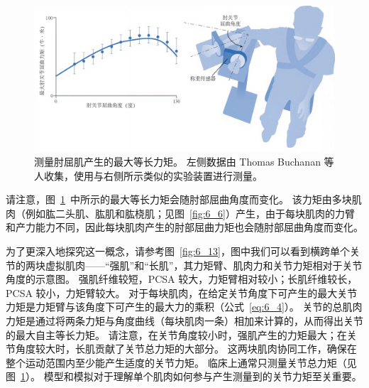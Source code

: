 \begin{figure}[!htb]
	\centering
	\includegraphics[width=1.0\linewidth]{chap6/6_12}
	\caption{测量肘屈肌产生的最大等长力矩。
		左侧数据由 Thomas Buchanan 等人\cite{buchanan1998muscular}收集，使用与右侧所示类似的实验装置进行测量。 \label{fig:6_12}}
\end{figure}


请注意，图~\ref{fig:6_12}~中所示的最大等长力矩会随肘部屈曲角度而变化。
该力矩由多块肌肉（例如肱二头肌、肱肌和肱桡肌；见图~\ref{fig:6_6}）产生，由于每块肌肉的力臂和产力能力不同，因此每块肌肉产生的肘部屈曲力矩也会随肘部屈曲角度而变化。


为了更深入地探究这一概念，请参考图~\ref{fig:6_13}，图中我们可以看到横跨单个关节的两块虚拟肌肉——“强肌”和“长肌”，其力矩臂、肌肉力和关节力矩相对于关节角度的示意图。
强肌纤维较短，PCSA 较大，力矩臂相对较小；长肌纤维较长，PCSA 较小，力矩臂较大。
对于每块肌肉，在给定关节角度下可产生的最大关节力矩是力矩臂与该角度下可产生的最大力的乘积（公式~\ref{eq:6_4}）。
关节的总肌肉力矩是通过将两条力矩与角度曲线（每块肌肉一条）相加来计算的，从而得出关节的最大自主等长力矩。
请注意，在关节角度较小时，强肌产生的力矩最大；在关节角度较大时，长肌贡献了关节总力矩的大部分。
这两块肌肉协同工作，确保在整个运动范围内至少能产生适度的关节力矩。
临床上通常只测量关节总力矩（见图~\ref{fig:6_12}）。
模型和模拟对于理解单个肌肉如何参与产生测量到的关节力矩至关重要。


